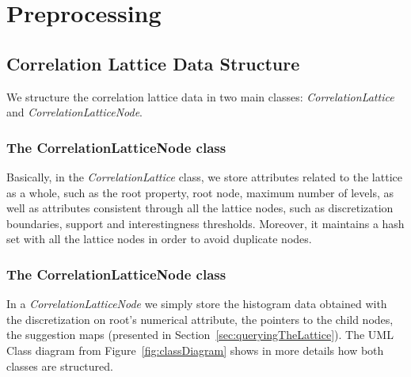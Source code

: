 \section{Preprocessing}

\subsection{Correlation Lattice Data Structure}

We structure the correlation lattice data in two main classes: \emph{CorrelationLattice} and
\emph{CorrelationLatticeNode}. 

\subsubsection{The CorrelationLatticeNode class}

Basically, in the \emph{CorrelationLattice} class, we store attributes related to the lattice as
a whole, such as the root property, root node, maximum number of levels, as well as attributes consistent through all
the lattice nodes, such as discretization boundaries, support and interestingness thresholds. Moreover, it maintains a
hash set with all the lattice nodes in order to avoid duplicate nodes.

\subsubsection{The CorrelationLatticeNode class}

In a \emph{CorrelationLatticeNode} we simply store the histogram data obtained with the discretization on root's
numerical attribute, the pointers to the child nodes, the suggestion maps (presented in
Section~\ref{sec:queryingTheLattice}). The UML Class diagram from Figure~\ref{fig:classDiagram} shows in more details
how both classes are structured.

